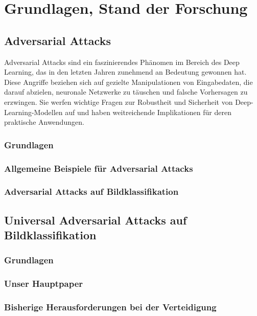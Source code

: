 \section{Grundlagen, Stand der Forschung}
\subsection{Adversarial Attacks}

Adversarial Attacks sind ein faszinierendes Phänomen im Bereich des Deep Learning, das in den letzten Jahren zunehmend an Bedeutung gewonnen hat. Diese Angriffe beziehen sich auf gezielte Manipulationen von Eingabedaten, die darauf abzielen, neuronale Netzwerke zu täuschen und falsche Vorhersagen zu erzwingen. Sie werfen wichtige Fragen zur Robustheit und Sicherheit von Deep-Learning-Modellen auf und haben weitreichende Implikationen für deren praktische Anwendungen. 

\subsubsection{Grundlagen}


\subsubsection{Allgemeine Beispiele für Adversarial Attacks}
\subsubsection{Adversarial Attacks auf Bildklassifikation}

\subsection{Universal Adversarial Attacks auf Bildklassifikation}
\subsubsection{Grundlagen}
\subsubsection{Unser Hauptpaper}
\subsubsection{Bisherige Herausforderungen bei der Verteidigung}